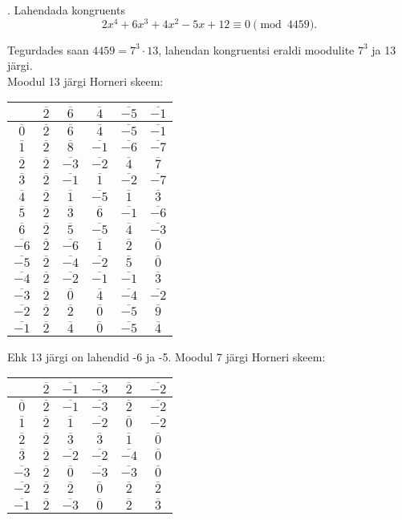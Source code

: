 \documentclass[a4paper, 10pt]{article}
\newcommand{\w}{\overline}
\begin{document}
. Lahendada kongruents $$2x^4+6x^3+4x^2-5x+12\equiv 0 \pmod{4459}.$$ 

\bigskip
Tegurdades saan $4459=7^3\cdot13$, lahendan kongruentsi eraldi moodulite $7^3$ ja 13 järgi.\\
Moodul 13 järgi Horneri skeem:\\
\begin{center}
\begin{tabular}{c|ccccc}
&$\w{2}$&$\w{6}$&$\w{4}$&$\w{-5}$&$\w{-1}$\\
\hline
$\w0$&$\w{2}$&$\w{6}$&$\w{4}$&$\w{-5}$&$\w{-1}$\\
$\w1$&$\w{2}$&$\w{8}$&$\w{-1}$&$\w{-6}$&$\w{-7}$\\
$\w2$&$\w{2}$&$\w{-3}$&$\w{-2}$&$\w{4}$&$\w{7}$\\
$\w3$&$\w{2}$&$\w{-1}$&$\w{1}$&$\w{-2}$&$\w{-7}$\\
$\w4$&$\w{2}$&$\w{1}$&$\w{-5}$&$\w{1}$&$\w{3}$\\
$\w5$&$\w{2}$&$\w{3}$&$\w{6}$&$\w{-1}$&$\w{-6}$\\
$\w6$&$\w{2}$&$\w{5}$&$\w{-5}$&$\w{4}$&$\w{-3}$\\
$\w{-6}$&$\w{2}$&$\w{-6}$&$\w{1}$&$\w{2}$&$\w{0}$\\
$\w{-5}$&$\w{2}$&$\w{-4}$&$\w{-2}$&$\w{5}$&$\w{0}$\\
$\w{-4}$&$\w{2}$&$\w{-2}$&$\w{-1}$&$\w{-1}$&$\w{3}$\\
$\w{-3}$&$\w{2}$&$\w{0}$&$\w{4}$&$\w{-4}$&$\w{-2}$\\
$\w{-2}$&$\w{2}$&$\w{2}$&$\w{0}$&$\w{-5}$&$\w{9}$\\
$\w{-1}$&$\w{2}$&$\w{4}$&$\w{0}$&$\w{-5}$&$\w{4}$\\
\end{tabular}
\bigskip
\end{center}
Ehk 13 järgi on lahendid -6 ja -5. Moodul 7 järgi Horneri skeem:\\
\begin{center}
\begin{tabular}{c|ccccc}
&$\w{2}$&$\w{-1}$&$\w{-3}$&$\w{2}$&$\w{-2}$\\
\hline
$\w0$&$\w{2}$&$\w{-1}$&$\w{-3}$&$\w{2}$&$\w{-2}$\\
$\w1$&$\w{2}$&$\w{1}$&$\w{-2}$&$\w{0}$&$\w{-2}$\\
$\w2$&$\w{2}$&$\w{3}$&$\w{3}$&$\w{1}$&$\w{0}$\\
$\w3$&$\w{2}$&$\w{-2}$&$\w{-2}$&$\w{-4}$&$\w{0}$\\
$\w{-3}$&$\w{2}$&$\w{0}$&$\w{-3}$&$\w{-3}$&$\w{0}$\\
$\w{-2}$&$\w{2}$&$\w{2}$&$\w{0}$&$\w{2}$&$\w{2}$\\
$\w{-1}$&$\w{2}$&$\w{-3}$&$\w{0}$&$\w{2}$&$\w{3}$\\
\end{tabular}
\bigskip
\end{center}
\end{document}
